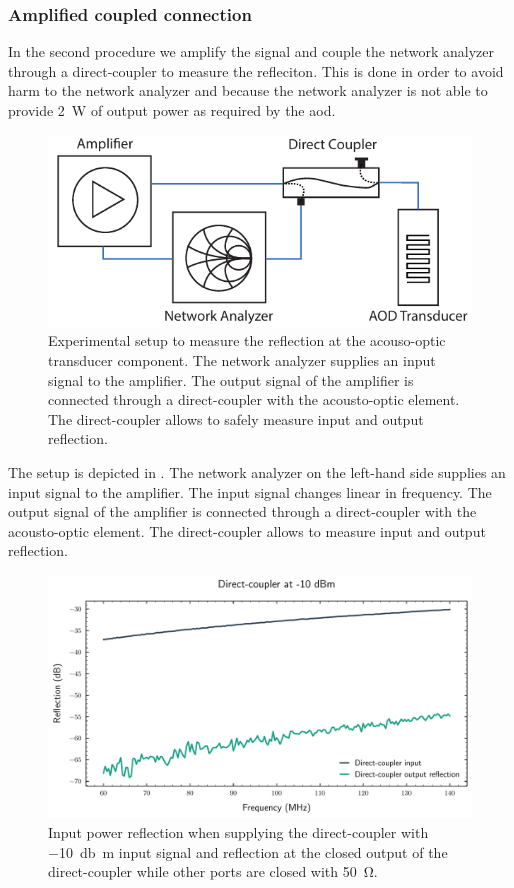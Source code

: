 \subsubsection{Amplified coupled connection}

In the second procedure we amplify the signal and couple the network analyzer
through a direct-coupler to measure the refleciton. This is done in order to
avoid harm to the network analyzer and because the network analyzer is not
able to provide \SI{2}{\watt} of output power as required by the \gls{aod}.
\begin{figure}[htb]
  \centering
  \includegraphics[width=.8\textwidth]{../figure/signal/setup-transducer.pdf}
  \caption{Experimental setup to measure the reflection at the acouso-optic
  transducer component. The network analyzer supplies an input signal to
  the amplifier. The output signal of the amplifier is connected through
  a direct-coupler with the acousto-optic element. The direct-coupler allows
  to safely measure input and output reflection.
  }\label{fig:signal_amplification_transducer_setup}
\end{figure}
The setup is depicted in .
The network analyzer on the left-hand side supplies an input signal to the
amplifier. The input signal changes linear in frequency. The output signal
of the amplifier is connected through a direct-coupler with the acousto-optic
element. The direct-coupler allows to measure input and output reflection.
\begin{figure}[htb]
  \centering
  \includegraphics[width=\textwidth]{../figure/signal/reflection/coupler.pdf}
  \caption{Input power reflection when supplying the direct-coupler with
    \SI{-10}{\decibel\meter} input signal and reflection at the closed output
    of the direct-coupler while other ports are closed with \SI{50}{\ohm}.
  }\label{fig:signal_reflection_coupler}
\end{figure}
